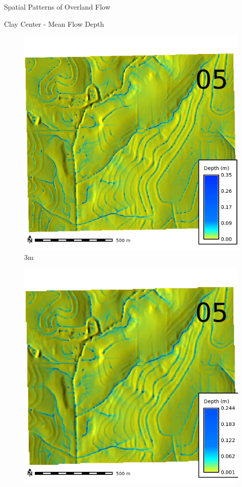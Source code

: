 \documentclass[
  ignorenonframetext,
]{beamer}
\begin{document}
\begin{frame}{Spatial Patterns of Overland Flow}
\begin{block}{Clay Center - Mean Flow Depth}
\begin{figure}[H]
{\centering \includegraphics{../output/clay-center/sensitivity_1/clay-center_depth_3_4_s_average.webp}

}

\caption{3m}

\end{figure}%

\begin{figure}[H]

{\centering \includegraphics{../output/clay-center/sensitivity_1/clay-center_depth_5_4_s_average.webp}

}
\end{figure}
\end{block}
\end{frame}
\end{document}
